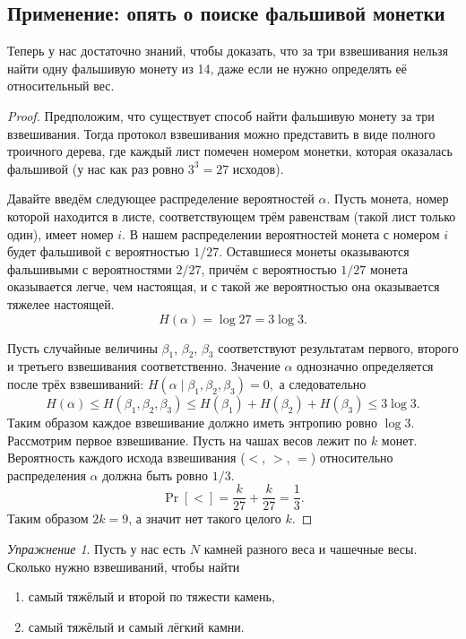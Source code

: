 \documentclass[12pt]{article}
\theoremstyle{definition}
\theoremstyle{plain}
\theoremstyle{remark}
\newtheorem{exercise}{Упражнение}[section]
\begin{document}
\subsection{Применение: опять о поиске фальшивой монетки}
Теперь у нас достаточно знаний, чтобы доказать, что за три взвешивания нельзя
найти одну фальшивую монету из 14, даже если не нужно определять её
относительный вес.
\begin{proof}
    Предположим, что существует способ найти фальшивую монету за три
    взвешивания. Тогда протокол взвешивания можно представить в виде полного
    троичного дерева, где каждый лист помечен номером монетки, которая оказалась
    фальшивой (у нас как раз ровно \(3^3=27\) исходов). 

    Давайте введём следующее распределение вероятностей \(\alpha\). 
    Пусть монета, номер которой находится в листе, соответствующем трём равенствам
    (такой лист только один), имеет номер \(i\). В нашем распределении
    вероятностей монета с номером \(i\) будет фальшивой с вероятностью \(1/27\).
    Оставшиеся монеты оказываются фальшивыми с вероятностями \(2/27\), причём
    с вероятностью \(1/27\) монета оказывается легче, чем настоящая, и с
    такой же вероятностью она оказывается тяжелее настоящей.
    \[
        H(\alpha) = \log 27 = 3\log 3.
    \]

    Пусть случайные величины \(\beta_1\), \(\beta_2\), \(\beta_3\) соответствуют
    результатам первого, второго и третьего взвешивания соответственно.
    Значение $\alpha$ однозначно определяется после трёх взвешиваний:
    \(
        H(\alpha\mid\beta_1,\beta_2,\beta_3) = 0,
    \)
    а следовательно
    \[
        H(\alpha) \le H(\beta_1,\beta_2,\beta_3) \le H(\beta_1) + H(\beta_2) +
        H(\beta_3) \le 3\log3.    
    \]
    Таким образом каждое взвешивание должно иметь энтропию ровно $\log3$.
    Рассмотрим первое взвешивание. Пусть на чашах весов лежит по $k$ монет.
    Вероятность каждого исхода взвешивания ($<$, $>$, $=$) относительно
    распределения $\alpha$ должна быть ровно $1/3$.
    \[
        \Pr[<] = \frac{k}{27} + \frac{k}{27} = \frac13.
    \]
    Таким образом $2k = 9$, а значит нет такого целого $k$.
\end{proof}
\begin{exercise}
    Пусть у нас есть $N$ камней разного веса и чашечные весы.
    Сколько нужно взвешиваний, чтобы найти 
    \begin{enumerate}
        \item самый тяжёлый и второй по тяжести камень,
        \item самый тяжёлый и самый лёгкий камни.
    \end{enumerate}

\end{exercise}
\end{document}
